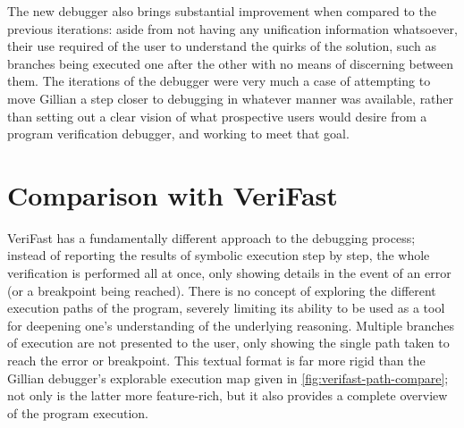 The new debugger also brings substantial improvement when compared to the
previous iterations: aside from not having any unification information
whatsoever, their use required of the user to understand the quirks of the
solution, such as branches being executed one after the other with no means of
discerning between them. The iterations of the debugger were very much a case of
attempting to move Gillian a step closer to debugging in whatever manner was
available, rather than setting out a clear vision of what prospective users
would desire from a program verification debugger, and working to meet that
goal.

\section{Comparison with VeriFast}

VeriFast has a fundamentally different approach to the debugging process;
instead of reporting the results of symbolic execution step by step, the whole
verification is performed all at once, only showing details in the event of an
error (or a breakpoint being reached). There is no concept of exploring the
different execution paths of the program, severely limiting its ability to be
used as a tool for deepening one's understanding of the underlying reasoning.
Multiple branches of execution are not presented to the user, only showing the
single path taken to reach the error or breakpoint. This textual format is far
more rigid than the Gillian debugger's explorable execution map given in
\autoref{fig:verifast-path-compare}; not only is the latter more feature-rich,
but it also provides a complete overview of the program execution.

